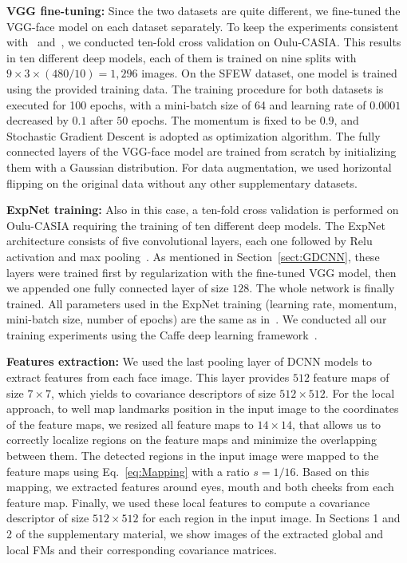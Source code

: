 \documentclass{bmvc2k}
\begin{document}
\textbf{VGG fine-tuning:}
Since the two datasets are quite different, we fine-tuned the VGG-face model on each dataset separately. To keep the experiments consistent with~\cite{ding2017facenet2expnet} and~\cite{ofodile2017automatic}, we conducted ten-fold cross validation on Oulu-CASIA. This results in ten different deep models, each of them is trained on nine splits with $9 \times 3 \times(480 / 10) =1,296$ images. On the SFEW dataset, one model is trained using the provided training data. The training procedure for both datasets is executed for 100 epochs, with a mini-batch size of 64 and learning rate of $0.0001$ decreased by $0.1$ after $50$ epochs. The momentum is fixed to be $0.9$, and Stochastic Gradient Descent is adopted as optimization algorithm.
The fully connected layers of the VGG-face model are trained from scratch by initializing them with a Gaussian distribution. For data augmentation, we used horizontal flipping on the original data without any other supplementary datasets.

\textbf{ExpNet training:} Also in this case, a ten-fold cross validation is performed on Oulu-CASIA requiring the training of ten different deep models. The ExpNet architecture consists of five convolutional layers, each one followed by Relu activation and max pooling~\cite{ding2017facenet2expnet}. As mentioned in Section~\ref{sect:GDCNN}, these layers were trained first by regularization with the fine-tuned VGG model, then we appended one fully connected layer of size $128$. The whole network is finally trained. All parameters used in the ExpNet training (learning rate, momentum, mini-batch size, number of epochs) are the same as in~\cite{ding2017facenet2expnet}. 
We conducted all our training experiments using the Caffe deep learning framework~\cite{jia2014caffe}.

\textbf{Features extraction:}
We used the last pooling layer of DCNN models to extract features from each face image. This layer provides $512$ feature maps of size $7 \times 7$, which yields to covariance descriptors of size $512 \times 512$.
For the local approach, to well map landmarks position in the input image to the coordinates of the feature maps, we resized all feature maps to $14\times 14$, that allows us to correctly localize regions on the feature maps and minimize the overlapping between them.
The detected regions in the input image were mapped to the feature maps using Eq.~\eqref{eq:Mapping} with a ratio $s=1/16$. Based on this mapping, we extracted features around eyes, mouth and both cheeks from each feature map. Finally, we used these local features to compute a covariance descriptor of size $512 \times 512$ for each region in the input image. In Sections 1 and 2 of the supplementary material, we show images of the extracted global and local FMs and their corresponding covariance matrices. 
\end{document}
